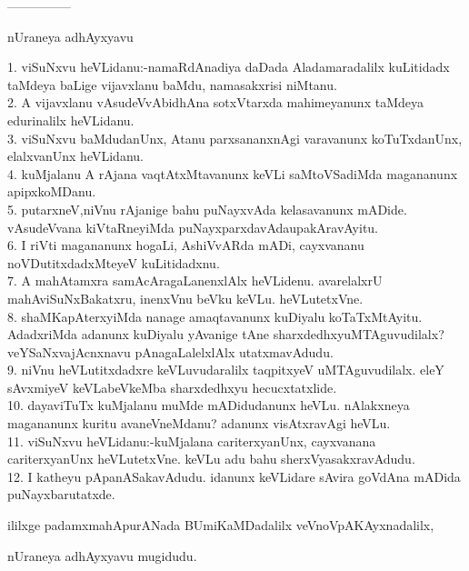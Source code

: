 \documentclass{article}
\begin{document}
\begin{center}
---------------
\end{center}

\begin{center}
nUraneya adhAyxyavu
\end{center}

1. viSuNxvu heVLidanu:-namaRdAnadiya daDada Aladamaradalilx kuLitidadx taMdeya baLige vijavxlanu baMdu, namasakxrisi niMtanu.\\
2. A vijavxlanu vAsudeVvAbidhAna sotxVtarxda mahimeyanunx taMdeya edurinalilx heVLidanu.\\
3. viSuNxvu baMdudanUnx, Atanu parxsananxnAgi varavanunx koTuTxdanUnx, elalxvanUnx heVLidanu.\\
4. kuMjalanu A rAjana vaqtAtxMtavanunx keVLi saMtoVSadiMda magananunx apipxkoMDanu.\\
5. putarxneV,niVnu rAjanige bahu puNayxvAda kelasavanunx mADide. vAsudeVvana kiVtaRneyiMda puNayxparxdavAdaupakAravAyitu.\\
6. I riVti magananunx hogaLi, AshiVvARda mADi, cayxvananu noVDutitxdadxMteyeV kuLitidadxnu.\\
7. A mahAtamxra samAcAragaLanenxlAlx heVLidenu. avarelalxrU mahAviSuNxBakatxru, inenxVnu beVku keVLu. heVLutetxVne.\\
8. shaMKapAterxyiMda nanage amaqtavanunx kuDiyalu koTaTxMtAyitu. AdadxriMda adanunx kuDiyalu yAvanige tAne sharxdedhxyuMTAguvudilalx? veYSaNxvajAcnxnavu pAnagaLalelxlAlx utatxmavAdudu.\\
9. niVnu heVLutitxdadxre keVLuvudaralilx taqpitxyeV uMTAguvudilalx. eleY sAvxmiyeV keVLabeVkeMba sharxdedhxyu hecucxtatxlide.\\
10. dayaviTuTx kuMjalanu muMde mADidudanunx heVLu. nAlakxneya magananunx kuritu avaneVneMdanu? adanunx visAtxravAgi heVLu.\\
11. viSuNxvu heVLidanu:-kuMjalana cariterxyanUnx, cayxvanana cariterxyanUnx heVLutetxVne. keVLu adu bahu sherxVyasakxravAdudu.\\
12. I katheyu pApanASakavAdudu. idanunx keVLidare sAvira goVdAna mADida puNayxbarutatxde.

\begin{center}
ililxge padamxmahApurANada BUmiKaMDadalilx veVnoVpAKAyxnadalilx,
\end{center}

\begin{center}
nUraneya adhAyxyavu mugidudu.
\end{center}
\end{document}
